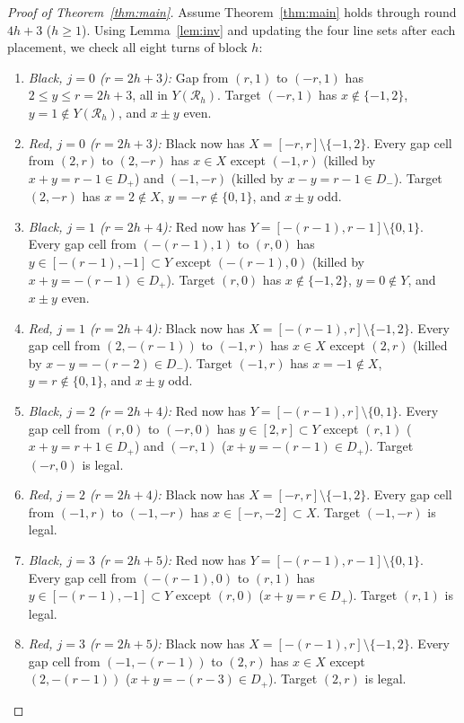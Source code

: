 \documentclass[11pt]{article}
\begin{document}
\begin{proof}[Proof of Theorem~\ref{thm:main}]
Assume Theorem~\ref{thm:main} holds through round $4h + 3$ ($h \ge 1$). Using Lemma~\ref{lem:inv} and updating the four line sets after each placement, we check all eight turns of block $h$:
\begin{enumerate}
  \item \emph{Black, $j = 0$ ($r = 2h + 3$):} Gap from $(r, 1)$ to $(-r, 1)$ has $2 \le y \le r = 2h + 3$, all in $Y(\mathcal{R}_h)$. Target $(-r, 1)$ has $x \notin \{-1, 2\}$, $y = 1 \notin Y(\mathcal{R}_h)$, and $x \pm y$ even.
  \item \emph{Red, $j = 0$ ($r = 2h + 3$):} Black now has $X = [-r, r] \setminus \{-1, 2\}$. Every gap cell from $(2, r)$ to $(2, -r)$ has $x \in X$ except $(-1, r)$ (killed by $x + y = r - 1 \in D_+$) and $(-1, -r)$ (killed by $x - y = r - 1 \in D_-$). Target $(2, -r)$ has $x = 2 \notin X$, $y = -r \notin \{0, 1\}$, and $x \pm y$ odd.
  \item \emph{Black, $j = 1$ ($r = 2h + 4$):} Red now has $Y = [-(r - 1), r - 1] \setminus \{0, 1\}$. Every gap cell from $(-(r - 1), 1)$ to $(r, 0)$ has $y \in [-(r - 1), -1] \subset Y$ except $(-(r - 1), 0)$ (killed by $x + y = -(r - 1) \in D_+$). Target $(r, 0)$ has $x \notin \{-1, 2\}$, $y = 0 \notin Y$, and $x \pm y$ even.
  \item \emph{Red, $j = 1$ ($r = 2h + 4$):} Black now has $X = [-(r - 1), r] \setminus \{-1, 2\}$. Every gap cell from $(2, -(r - 1))$ to $(-1, r)$ has $x \in X$ except $(2, r)$ (killed by $x - y = -(r - 2) \in D_-$). Target $(-1, r)$ has $x = -1 \notin X$, $y = r \notin \{0, 1\}$, and $x \pm y$ odd.
  \item \emph{Black, $j = 2$ ($r = 2h + 4$):} Red now has $Y = [-(r - 1), r] \setminus \{0, 1\}$. Every gap cell from $(r, 0)$ to $(-r, 0)$ has $y \in [2, r] \subset Y$ except $(r, 1)$ ($x + y = r + 1 \in D_+$) and $(-r, 1)$ ($x + y = -(r - 1) \in D_+$). Target $(-r, 0)$ is legal.
  \item \emph{Red, $j = 2$ ($r = 2h + 4$):} Black now has $X = [-r, r] \setminus \{-1, 2\}$. Every gap cell from $(-1, r)$ to $(-1, -r)$ has $x \in [-r, -2] \subset X$. Target $(-1, -r)$ is legal.
  \item \emph{Black, $j = 3$ ($r = 2h + 5$):} Red now has $Y = [-(r - 1), r - 1] \setminus \{0, 1\}$. Every gap cell from $(-(r - 1), 0)$ to $(r, 1)$ has $y \in [-(r - 1), -1] \subset Y$ except $(r, 0)$ ($x + y = r \in D_+$). Target $(r, 1)$ is legal.
  \item \emph{Red, $j = 3$ ($r = 2h + 5$):} Black now has $X = [-(r - 1), r] \setminus \{-1, 2\}$. Every gap cell from $(-1, -(r - 1))$ to $(2, r)$ has $x \in X$ except $(2, -(r - 1))$ ($x + y = -(r - 3) \in D_+$). Target $(2, r)$ is legal.
\end{enumerate}


\end{proof}
\end{document}
